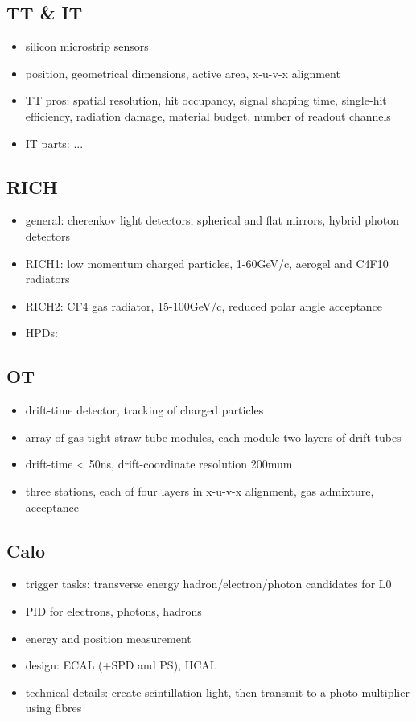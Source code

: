 \subsection{TT \& IT}
\begin{itemize}
  \item silicon microstrip sensors
  \item position, geometrical dimensions, active area, x-u-v-x alignment
  \item TT pros: spatial resolution, hit occupancy, signal shaping time, single-hit efficiency, radiation damage, material budget, number of readout channels
  \item IT parts: ...
\end{itemize}
\subsection{RICH}
\begin{itemize}
  \item general: cherenkov light detectors, spherical and flat mirrors, hybrid photon detectors
  \item RICH1: low momentum charged particles, 1-60GeV/c, aerogel and C4F10 radiators
  \item RICH2: CF4 gas radiator, 15-100GeV/c, reduced polar angle acceptance
  \item HPDs: 
\end{itemize}
\subsection{OT}
\begin{itemize}
  \item drift-time detector, tracking of charged particles
  \item array of gas-tight straw-tube modules, each module two layers of drift-tubes
  \item drift-time < 50ns, drift-coordinate resolution 200mum
  \item three stations, each of four layers in x-u-v-x alignment, gas admixture, acceptance
\end{itemize}
\subsection{Calo}
\begin{itemize}
  \item trigger tasks: transverse energy hadron/electron/photon candidates for L0
  \item PID for electrons, photons, hadrons
  \item energy and position measurement
  \item design: ECAL (+SPD and PS), HCAL
  \item technical details: create scintillation light, then transmit to a photo-multiplier using fibres
\end{itemize}
